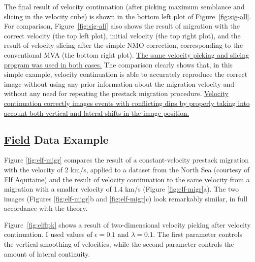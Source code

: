 The final result of velocity continuation (after picking maximum semblance and
slicing in the velocity cube) is shown in the bottom left plot of
Figure~\ref{fig:sig-all}. For comparison, Figure~\ref{fig:sig-all} also shows
the result of migration with the correct velocity (the top left plot), initial
velocity (the top right plot), and the result of velocity slicing after the
simple NMO correction, corresponding to the conventional MVA (the bottom right
plot). \uline{The same velocity picking and slicing program was used in both cases.}
The comparison clearly shows that, in this simple example, velocity
continuation is able to accurately reproduce the correct image without using
any prior information about the migration velocity and without any need for
repeating the prestack migration procedure. \uline{Velocity continuation correctly
images events with conflicting dips by properly taking into account both
vertical and lateral shifts in the image position.}


\subsection{\uline{Field} Data Example}

Figure \ref{fig:elf-migr} compares the result of a constant-velocity prestack
migration with the velocity of 2 km/s, applied to a dataset from the North Sea
(courtesy of Elf Aquitaine) and the result of velocity continuation to the
same velocity from a migration with a smaller velocity of 1.4 km/s (Figure
\ref{fig:elf-migr}a). The two images (Figures \ref{fig:elf-migr}b and
\ref{fig:elf-migr}c) look remarkably similar, in full accordance with the
theory.


Figure~\ref{fig:elffpk} shows a result of two-dimensional velocity
picking after velocity continuation. I used values of $\epsilon=0.1$
and $\lambda=0.1$. The first parameter controls the vertical smoothing
of velocities, while the second parameter controls the amount of
lateral continuity.

